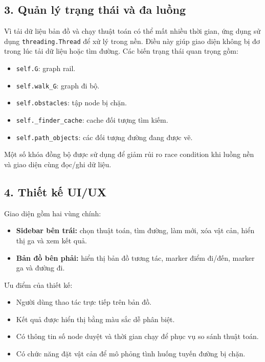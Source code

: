 \documentclass[12pt,a4paper]{article}
\begin{document}
\subsection*{3. Quản lý trạng thái và đa luồng}

Vì tải dữ liệu bản đồ và chạy thuật toán có thể mất nhiều thời gian, ứng dụng sử dụng \texttt{threading.Thread} để xử lý trong nền. Điều này giúp giao diện không bị đơ trong lúc tải dữ liệu hoặc tìm đường. Các biến trạng thái quan trọng gồm:
\begin{itemize}
    \item \texttt{self.G}: graph rail.
    \item \texttt{self.walk\_G}: graph đi bộ.
    \item \texttt{self.obstacles}: tập node bị chặn.
    \item \texttt{self.\_finder\_cache}: cache đối tượng tìm kiếm.
    \item \texttt{self.path\_objects}: các đối tượng đường đang được vẽ.
\end{itemize}

Một số khóa đồng bộ được sử dụng để giảm rủi ro race condition khi luồng nền và giao diện cùng đọc/ghi dữ liệu.

\subsection*{4. Thiết kế UI/UX}

Giao diện gồm hai vùng chính:
\begin{itemize}
    \item \textbf{Sidebar bên trái:} chọn thuật toán, tìm đường, làm mới, xóa vật cản, hiển thị ga và xem kết quả.
    \item \textbf{Bản đồ bên phải:} hiển thị bản đồ tương tác, marker điểm đi/đến, marker ga và đường đi.
\end{itemize}

Ưu điểm của thiết kế:
\begin{itemize}
    \item Người dùng thao tác trực tiếp trên bản đồ.
    \item Kết quả được hiển thị bằng màu sắc dễ phân biệt.
    \item Có thông tin số node duyệt và thời gian chạy để phục vụ so sánh thuật toán.
    \item Có chức năng đặt vật cản để mô phỏng tình huống tuyến đường bị chặn.
\end{itemize}
\end{document}
